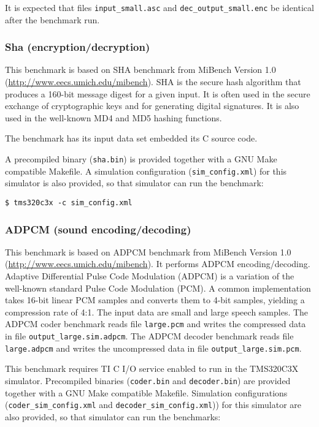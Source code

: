 It is expected that files \texttt{input\_small.asc} and \texttt{dec\_output\_small.enc} be identical after the benchmark run.

\subsubsection{Sha (encryption/decryption)}

This benchmark is based on SHA benchmark from MiBench Version 1.0 (\url{http://www.eecs.umich.edu/mibench}).
SHA is the secure hash algorithm that produces a 160-bit message digest for a given input. It is often
used in the secure exchange of cryptographic keys and for generating digital signatures. It is also used in the
well-known MD4 and MD5 hashing functions.

The benchmark has its input data set embedded its C source code.

A precompiled binary (\texttt{sha.bin}) is provided together with a GNU Make compatible Makefile.
A simulation configuration (\texttt{sim\_config.xml}) for this simulator is also provided, so that simulator can run the benchmark:

\begin{verbatim}
$ tms320c3x -c sim_config.xml
\end{verbatim}

\subsubsection{ADPCM (sound encoding/decoding)}

This benchmark is based on ADPCM benchmark from MiBench Version 1.0 (\url{http://www.eecs.umich.edu/mibench}).
It performs ADPCM encoding/decoding. Adaptive Differential Pulse Code Modulation (ADPCM) is a variation
of the well-known standard Pulse Code Modulation (PCM). A common implementation takes 16-bit linear
PCM samples and converts them to 4-bit samples, yielding a compression rate of 4:1. The input data are
small and large speech samples.
The ADPCM coder benchmark reads file \texttt{large.pcm} and writes the compressed data in file \texttt{output\_large.sim.adpcm}.
The ADPCM decoder benchmark reads file \texttt{large.adpcm} and writes the uncompressed data in file \texttt{output\_large.sim.pcm}.

This benchmark requires TI C I/O service enabled to run in the TMS320C3X simulator.
Precompiled binaries (\texttt{coder.bin} and \texttt{decoder.bin}) are provided together with a GNU Make compatible Makefile.
Simulation configurations (\texttt{coder\_sim\_config.xml} and \texttt{decoder\_sim\_config.xml})) for this simulator are also provided, so that simulator can run the benchmarks:

